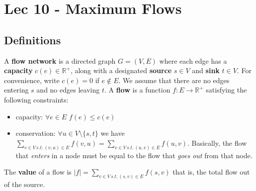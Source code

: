 \chapter{Lec 10 - Maximum Flows}

\section{Definitions}
A \textbf{flow network} is a directed graph $G = (V, E)$ where each edge has a \textbf{capacity} $c(e) \in \mathbb{R}^+$, along with a designated \textbf{source} $s \in V$ and \textbf{sink} $t \in V$. For convenience, write $c(e) = 0$ if $e \notin E$. We assume that there are no edges entering $s$ and no edges leaving $t$.\newline\newline
A \textbf{flow} is a function $f: E \rightarrow \mathbb{R}^+$ satisfying the following constraints:
\begin{itemize}
    \item capacity: $\forall e \in E \,\, f(e) \leq c(e)$
    \item conservation: $\forall u \in V \setminus \{s, t\}$ we have $\sum_{v \in V \, s.t.\, (v, u) \in E}f(v, u) = \sum_{v \in V \, s.t.\, (u, v) \in E}f(u, v)$. Basically, the flow that \textit{enters} in a node must be equal to the flow that \textit{goes out} from that node.
\end{itemize}
The \textbf{value} of a flow is $|f| = \sum_{v \in V \, s.t. \, (s,v) \in E}f(s,v)$ that is, the total flow out of the source.

